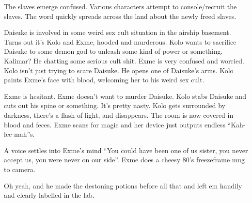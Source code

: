 The slaves emerge confused. Various characters attempt to console/recruit the slaves. The word quickly spreads across the land about the newly freed slaves.\medskip

Daisuke is involved in some weird sex cult situation in the airship basement. Turns out it’s Kolo and Exme, hooded and murderous. Kolo wants to sacrifice Daisuke to some demon god to unleash some kind of power or something. Kalimar? He chatting some serious cult shit. Exme is very confused and worried. Kolo isn’t just trying to scare Daisuke. He opens one of Daisuke’s arms. Kolo paints Exme’s face with blood, welcoming her to his weird sex cult.\medskip

Exme is hesitant. Exme doesn’t want to murder Daisuke. Kolo stabs Daisuke and cuts out his spine or something. It’s pretty nasty. Kolo gets surrounded by darkness, there’s a flash of light, and disappears. The room is now covered in blood and feces. Exme scans for magic and her device just outputs endless “Kah-lee-mah”s.\medskip

A voice settles into Exme’s mind “You could have been one of us sister, you never accept us, you were never on our side”. Exme does a cheesy 80’s freezeframe mug to camera.\medskip

Oh yeah, and he made the destoning potions before all that and left em handily and clearly labelled in the lab.\medskip

\vspace*{5mm}

